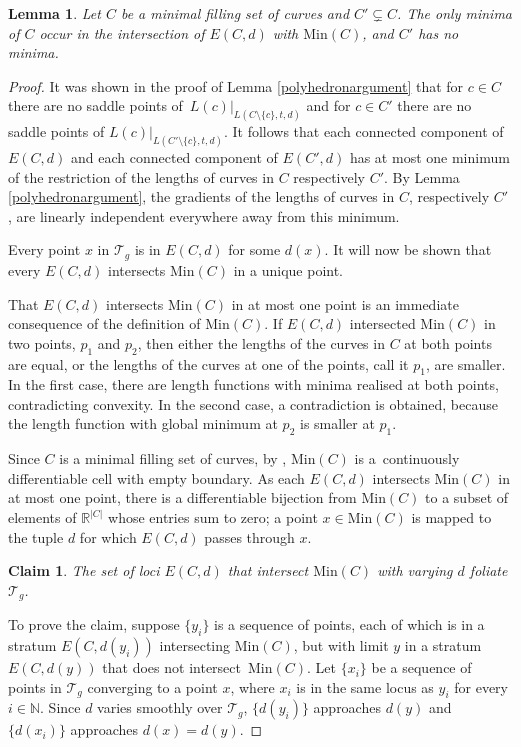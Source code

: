 \documentclass[11pt]{article}
\numberwithin{equation}{section}
\numberwithin{equation}{section}
\newtheorem{Lemma}[Theorem]{Lemma}
\newtheorem*{Claim}{Claim}
{ \theoremstyle{definition}
 \newtheorem{Definition}[Theorem]{Definition}
 \newtheorem{Note}[Theorem]{Note}
 \newtheorem{Example}[Theorem]{Example}
 \newtheorem{Remark}[Theorem]{Remark}
 \newtheorem{observation}[Theorem]{Observation}
}
\begin{document}
\begin{Lemma}
\label{minimalem}
Let $C$ be a minimal filling set of curves and $C'\subsetneq C$. The only minima of $C$ occur in the intersection of $E(C,d)$ with $\mathrm{Min}(C)$, and $C'$ has no minima.
\end{Lemma}
\begin{proof}
It was shown in the proof of Lemma \ref{polyhedronargument} that for $c\in C$ there are no saddle points of~$L(c)|_{L(C\setminus\{c\},t,d)}$ and for $c\in C'$ there are no saddle points of $L(c)|_{L(C'\setminus\{c\},t,d)}$. It follows that each connected component of $E(C,d)$ and each connected component of $E(C',d)$ has at most one minimum of the restriction of the lengths of curves in $C$ respectively $C'$. By Lemma \ref{polyhedronargument}, the gradients of the lengths of curves in $C$, respectively $C'$, are linearly independent everywhere away from this minimum.

Every point $x$ in $\mathcal{T}_{g}$ is in $E(C,d)$ for some $d(x)$. It will now be shown that every $E(C,d)$ intersects $\mathrm{Min}(C)$ in a unique point.

That $E(C,d)$ intersects $\mathrm{Min}(C)$ in at most one point is an immediate consequence of the definition of $\mathrm{Min}(C)$. If $E(C,d)$ intersected $\mathrm{Min}(C)$ in two points, $p_{1}$ and $p_{2}$, then either the lengths of the curves in $C$ at both points are equal, or the lengths of the curves at one of the points, call it $p_{1}$, are smaller. In the first case, there are length functions with minima realised at both points, contradicting convexity. In the second case, a contradiction is obtained, because the length function with global minimum at $p_{2}$ is smaller at $p_{1}$.

Since $C$ is a minimal filling set of curves, by \cite[Lemma 9, Theorem 10]{SchmutzMorse}, $\mathrm{Min}(C)$ is a~continuously differentiable cell with empty boundary. As each $E(C,d)$ intersects $\mathrm{Min}(C)$ in at most one point, there is a differentiable bijection from $\mathrm{Min}(C)$ to a subset of elements of $\mathbb{R}^{|C|}$ whose entries sum to zero; a point $x\in \mathrm{Min}(C)$ is mapped to the tuple $d$ for which $E(C,d)$ passes through $x$.

\begin{Claim}
The set of loci $E(C,d)$ that intersect $\mathrm{Min}(C)$ with varying $d$ foliate $\mathcal{T}_{g}$.
\end{Claim}

To prove the claim, suppose $\{y_{i}\}$ is a sequence of points, each of which is in a stratum $E(C,d(y_{i}))$ intersecting $\mathrm{Min}(C)$, but with limit $y$ in a stratum $E(C,d(y))$ that does not intersect~$\mathrm{Min}(C)$. Let $\{x_{i}\}$ be a sequence of points in $\mathcal{T}_{g}$ converging to a point $x$, where $x_{i}$ is in the same locus as $y_{i}$ for every $i\in \mathbb{N}$. Since $d$ varies smoothly over $\mathcal{T}_{g}$, $\{d(y_{i})\}$ approaches $d(y)$ and~$\{d(x_{i})\}$ approaches $d(x)=d(y)$.


\end{proof}
\end{document}
